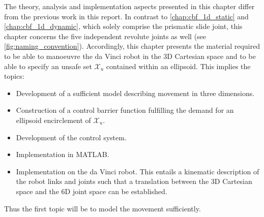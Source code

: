 %
The theory, analysis and implementation aspects presented in this chapter differ from the previous work in this report. In contrast to \autoref{chap:cbf_1d_static} and \autoref{chap:cbf_1d_dynamic}, which solely comprise the prismatic slide joint, this chapter concerns the five independent revolute joints as well (see \autoref{fig:naming_convention}). Accordingly, this chapter presents the material required to be able to manoeuvre the da Vinci robot in the 3D Cartesian space and to be able to specify an unsafe set $\mathcal{X}_u$ contained within an ellipsoid. This implies the topics:
\begin{itemize}
	\itemsep-0.7mm
\item Development of a sufficient model describing movement in three dimensions.
\item Construction of a control barrier function fulfilling the demand for an ellipsoid encirclement of $\mathcal{X}_u$.
\item Development of the control system.
\item Implementation in MATLAB.
\item Implementation on the da Vinci robot. This entails a kinematic description of the robot links and joints such that a translation between the 3D Cartesian space and the 6D joint space can be established.
\end{itemize}
Thus the first topic will be to model the movement sufficiently.
